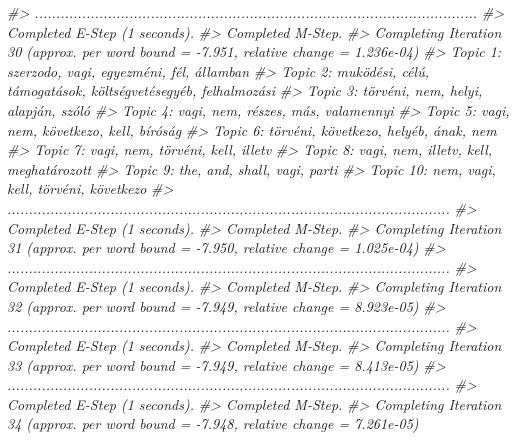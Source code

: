 \documentclass[
]{book}
\newenvironment{Shaded}{\begin{snugshade}}{\end{snugshade}}
\newcommand{\CommentTok}[1]{\textcolor[rgb]{0.56,0.35,0.01}{\textit{#1}}}
\begin{document}
\begin{Shaded}
\begin{Highlighting}[]
\CommentTok{\#\textgreater{} .......................................................................................................}
\CommentTok{\#\textgreater{} Completed E{-}Step (1 seconds). }
\CommentTok{\#\textgreater{} Completed M{-}Step. }
\CommentTok{\#\textgreater{} Completing Iteration 30 (approx. per word bound = {-}7.951, relative change = 1.236e{-}04) }
\CommentTok{\#\textgreater{} Topic 1: szerzodo, vagi, egyezméni, fél, államban }
\CommentTok{\#\textgreater{}  Topic 2: muködési, célú, támogatások, költségvetésegyéb, felhalmozási }
\CommentTok{\#\textgreater{}  Topic 3: törvéni, nem, helyi, alapján, szóló }
\CommentTok{\#\textgreater{}  Topic 4: vagi, nem, részes, más, valamennyi }
\CommentTok{\#\textgreater{}  Topic 5: vagi, nem, következo, kell, bíróság }
\CommentTok{\#\textgreater{}  Topic 6: törvéni, következo, helyéb, ának, nem }
\CommentTok{\#\textgreater{}  Topic 7: vagi, nem, törvéni, kell, illetv }
\CommentTok{\#\textgreater{}  Topic 8: vagi, nem, illetv, kell, meghatározott }
\CommentTok{\#\textgreater{}  Topic 9: the, and, shall, vagi, parti }
\CommentTok{\#\textgreater{}  Topic 10: nem, vagi, kell, törvéni, következo }
\CommentTok{\#\textgreater{} .......................................................................................................}
\CommentTok{\#\textgreater{} Completed E{-}Step (1 seconds). }
\CommentTok{\#\textgreater{} Completed M{-}Step. }
\CommentTok{\#\textgreater{} Completing Iteration 31 (approx. per word bound = {-}7.950, relative change = 1.025e{-}04) }
\CommentTok{\#\textgreater{} .......................................................................................................}
\CommentTok{\#\textgreater{} Completed E{-}Step (1 seconds). }
\CommentTok{\#\textgreater{} Completed M{-}Step. }
\CommentTok{\#\textgreater{} Completing Iteration 32 (approx. per word bound = {-}7.949, relative change = 8.923e{-}05) }
\CommentTok{\#\textgreater{} .......................................................................................................}
\CommentTok{\#\textgreater{} Completed E{-}Step (1 seconds). }
\CommentTok{\#\textgreater{} Completed M{-}Step. }
\CommentTok{\#\textgreater{} Completing Iteration 33 (approx. per word bound = {-}7.949, relative change = 8.413e{-}05) }
\CommentTok{\#\textgreater{} .......................................................................................................}
\CommentTok{\#\textgreater{} Completed E{-}Step (1 seconds). }
\CommentTok{\#\textgreater{} Completed M{-}Step. }
\CommentTok{\#\textgreater{} Completing Iteration 34 (approx. per word bound = {-}7.948, relative change = 7.261e{-}05) }

\end{Highlighting}
\end{Shaded}
\end{document}
